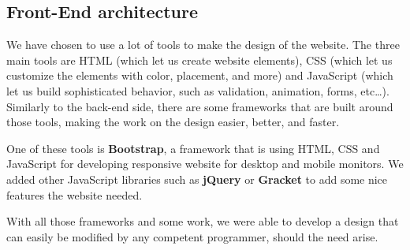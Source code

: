 \subsection{Front-End architecture}

We have chosen to use a lot of tools to make the design of the website. The
three main tools are HTML (which let us create website elements), CSS (which
let us customize the elements with color, placement, and more) and JavaScript
(which let us build sophisticated behavior, such as validation, animation,
forms, etc\ldots{}). Similarly to the back-end side, there are some frameworks
that are built around those tools, making the work on the design easier, better,
and faster. \newline

One of these tools is \textbf{Bootstrap}, a framework that is using HTML, CSS
and JavaScript for developing responsive website for desktop and mobile
monitors. We added other JavaScript libraries such as \textbf{jQuery} or
\textbf{Gracket} to add some nice features the website needed. \newline

With all those frameworks and some work, we were able to develop a design that
can easily be modified by any competent programmer, should the need arise.
